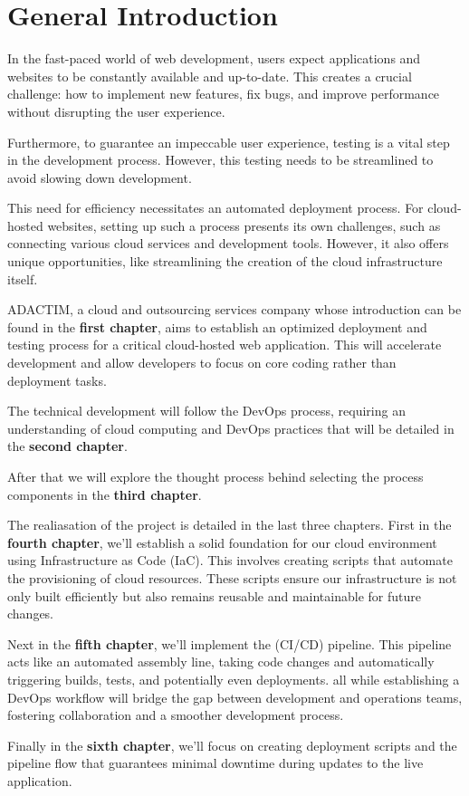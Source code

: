 \chapter*{General Introduction}
\noindent In the fast-paced world of web development, users expect applications and websites to be constantly available and up-to-date. This creates a crucial challenge: how to implement new features, fix bugs, and improve performance without disrupting the user experience.
\par
\noindent Furthermore, to guarantee an impeccable user experience, testing is a vital step in the development process. However, this testing needs to be streamlined to avoid slowing down development.
\par
\noindent This need for efficiency necessitates an automated deployment process. For cloud-hosted websites, setting up such a process presents its own challenges, such as connecting various cloud services and development tools. However, it also offers unique opportunities, like streamlining the creation of the cloud infrastructure itself.
\par 
\noindent ADACTIM, a cloud and outsourcing services company whose introduction can be found in the \textbf{first chapter}, aims to establish an optimized deployment and testing process for a critical cloud-hosted web application. This will accelerate development and allow developers to focus on core coding rather than deployment tasks.
\par 
\noindent The technical development will follow the DevOps process, requiring an understanding of cloud computing and DevOps practices that will be detailed in the \textbf{second chapter}.
\par
\noindent After that we will explore the thought process behind selecting the process components in the \textbf{third chapter}.
\par 
\noindent The realiasation of the project is detailed in the last three chapters. First in the \textbf{fourth chapter}, we'll establish a solid foundation for our cloud environment using Infrastructure as Code (IaC). This involves creating scripts that automate the provisioning of cloud resources. These scripts ensure our infrastructure is not only built efficiently but also remains reusable and maintainable for future changes.
\par
\noindent Next in the \textbf{fifth chapter}, we'll implement the (CI/CD) pipeline. This pipeline acts like an automated assembly line, taking code changes and automatically triggering builds, tests, and potentially even deployments. all while establishing a DevOps workflow will bridge the gap between development and operations teams, fostering collaboration and a smoother development process.
\par
\noindent Finally in the \textbf{sixth chapter}, we'll focus on creating deployment scripts and the pipeline flow that guarantees minimal downtime during updates to the live application.